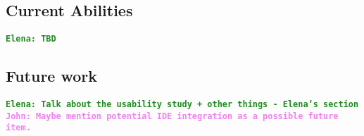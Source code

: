 \documentclass[12pt]{article}
\newcommand{\comment}[1]{{\bf \tt  {#1}}}
\newcommand{\emcomment}[1]{\textcolor{ForestGreen}{\comment{Elena: {#1}}}}
\newcommand{\jwcomment}[1]{\textcolor{violet}{\comment{John: {#1}}}}
\begin{document}
	\subsection{Current Abilities}\label{subsec:current-abilities}
	\emcomment{TBD}
	

	\subsection{Future work}\label{subsec:future}
	\emcomment{Talk about the usability study + other things - Elena's section}
	\jwcomment{Maybe mention potential IDE integration as a possible future item.}



\end{document}
